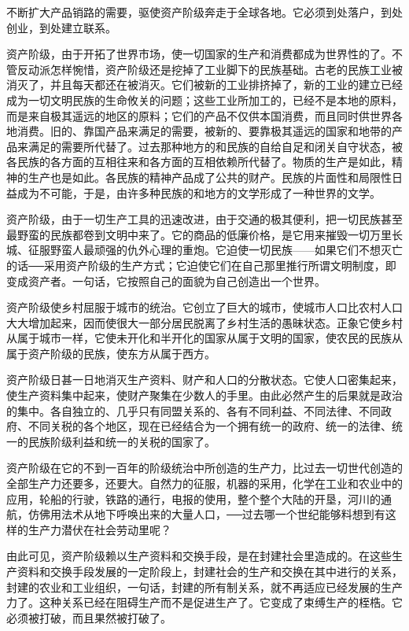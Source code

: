 \documentclass[UTF8]{ctexart}
\begin{document}
不断扩大产品销路的需要，驱使资产阶级奔走于全球各地。它必须到处落户，到处创业，到处建立联系。

资产阶级，由于开拓了世界市场，使一切国家的生产和消费都成为世界性的了。不管反动派怎样惋惜，资产阶级还是挖掉了工业脚下的民族基础。古老的民族工业被消灭了，并且每天都还在被消灭。它们被新的工业排挤掉了，新的工业的建立已经成为一切文明民族的生命攸关的问题；这些工业所加工的，已经不是本地的原料，而是来自极其遥远的地区的原料；它们的产品不仅供本国消费，而且同时供世界各地消费。旧的、靠国产品来满足的需要，被新的、要靠极其遥远的国家和地带的产品来满足的需要所代替了。过去那种地方的和民族的自给自足和闭关自守状态，被各民族的各方面的互相往来和各方面的互相依赖所代替了。物质的生产是如此，精神的生产也是如此。各民族的精神产品成了公共的财产。民族的片面性和局限性日益成为不可能，于是，由许多种民族的和地方的文学形成了一种世界的文学。

资产阶级，由于一切生产工具的迅速改进，由于交通的极其便利，把一切民族甚至最野蛮的民族都卷到文明中来了。它的商品的低廉价格，是它用来摧毁一切万里长城、征服野蛮人最顽强的仇外心理的重炮。它迫使一切民族——如果它们不想灭亡的话──采用资产阶级的生产方式；它迫使它们在自己那里推行所谓文明制度，即变成资产者。一句话，它按照自己的面貌为自己创造出一个世界。

资产阶级使乡村屈服于城市的统治。它创立了巨大的城市，使城市人口比农村人口大大增加起来，因而使很大一部分居民脱离了乡村生活的愚昧状态。正象它使乡村从属于城市一样，它使未开化和半开化的国家从属于文明的国家，使农民的民族从属于资产阶级的民族，使东方从属于西方。

资产阶级日甚一日地消灭生产资料、财产和人口的分散状态。它使人口密集起来，使生产资料集中起来，使财产聚集在少数人的手里。由此必然产生的后果就是政治的集中。各自独立的、几乎只有同盟关系的、各有不同利益、不同法律、不同政府、不同关税的各个地区，现在已经结合为一个拥有统一的政府、统一的法律、统一的民族阶级利益和统一的关税的国家了。

资产阶级在它的不到一百年的阶级统治中所创造的生产力，比过去一切世代创造的全部生产力还要多，还要大。自然力的征服，机器的采用，化学在工业和农业中的应用，轮船的行驶，铁路的通行，电报的使用，整个整个大陆的开垦，河川的通航，仿佛用法术从地下呼唤出来的大量人口，──过去哪一个世纪能够料想到有这样的生产力潜伏在社会劳动里呢？

由此可见，资产阶级赖以生产资料和交换手段，是在封建社会里造成的。在这些生产资料和交换手段发展的一定阶段上，封建社会的生产和交换在其中进行的关系，封建的农业和工业组织，一句话，封建的所有制关系，就不再适应已经发展的生产力了。这种关系已经在阻碍生产而不是促进生产了。它变成了束缚生产的桎梏。它必须被打破，而且果然被打破了。
\end{document}

